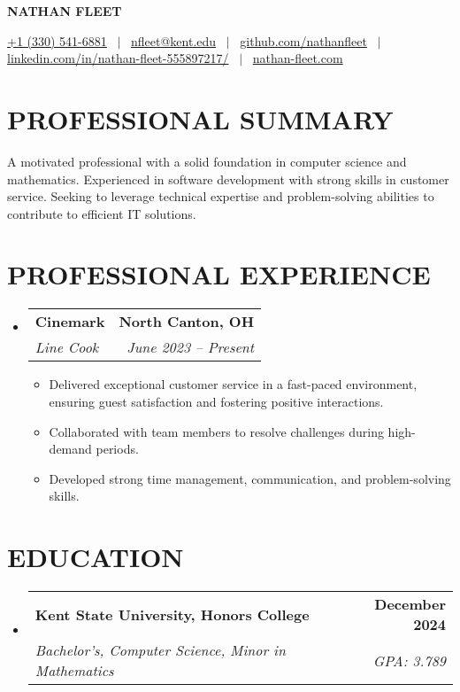\documentclass[letterpaper,11pt]{article}
\makeatletter
\newcommand{\resumeItemPlain}[1]{
  \item\small{
    {#1 \vspace{-2pt}}
  }
}
\newcommand{\resumeSubheading}[4]{
  \vspace{-1pt}\item
    \begin{tabular*}{0.97\textwidth}[t]{l@{\extracolsep{\fill}}r}
      \textbf{#1} & \textbf{#2} \\
      \textit{\small#3} & \textit{\small #4} \\
    \end{tabular*}\vspace{-5pt}
}
\newcommand{\resumeItemListStart}{\begin{itemize}[leftmargin=*,label=\textbullet]}
\newcommand{\resumeItemListEnd}{\end{itemize}}
\makeatother
\begin{document}
\begin{center}
  \textbf{\Huge NATHAN FLEET}
\end{center}

\begin{center}
  \href{tel:+13305416881}{+1 (330) 541-6881} \, $\vert$ \,
  \href{mailto:nfleet@kent.edu}{nfleet@kent.edu} \, $\vert$ \,
  \href{https://github.com/nathanfleet}{github.com/nathanfleet} \, $\vert$ \,
  \href{https://linkedin.com/in/nathan-fleet-555897217/}{linkedin.com/in/nathan-fleet-555897217/} \, $\vert$ \,
  \href{https://www.nathan-fleet.com}{nathan-fleet.com}
\end{center}

\section{PROFESSIONAL SUMMARY}
  \small{A motivated professional with a solid foundation in computer science and mathematics. Experienced in software development with strong skills in customer service. Seeking to leverage technical expertise and problem-solving abilities to contribute to efficient IT solutions.}

\section{PROFESSIONAL EXPERIENCE}
    \begin{itemize}[leftmargin=0pt,label={}]
    \resumeSubheading
        {Cinemark}{North Canton, OH}
        {Line Cook}{June 2023 -- Present}
        \resumeItemListStart
            \resumeItemPlain{}
                {Delivered exceptional customer service in a fast-paced environment, ensuring guest satisfaction and fostering positive interactions.}
            \resumeItemPlain{}
                {Collaborated with team members to resolve challenges during high-demand periods.}
            \resumeItemPlain{}
                {Developed strong time management, communication, and problem-solving skills.}
    \resumeItemListEnd
\end{itemize}

\section{EDUCATION}
  \begin{itemize}[leftmargin=0pt,label={}]
    \resumeSubheading
      {Kent State University, Honors College}{December 2024}
      {Bachelor's, Computer Science, Minor in Mathematics}{GPA: 3.789}
  \end{itemize}
\end{document}
